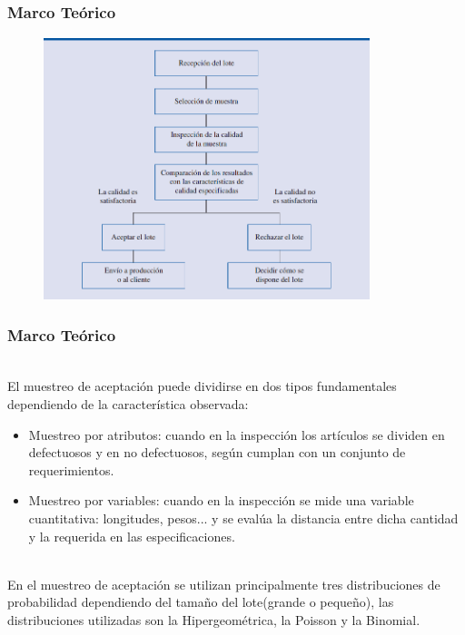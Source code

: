 \documentclass[11pt]{beamer}
\begin{document}
\begin{frame}
\frametitle{Marco Teórico}
\begin{figure}[!h]
        \includegraphics[width=9.5cm]{IMAGENES/MA.png}
        \label{figura1}
\end{figure}
\end{frame}

\begin{frame}
\frametitle{Marco Teórico}
~\\El muestreo de aceptación puede dividirse en dos tipos fundamentales dependiendo de la característica observada:
\begin{itemize}
\item Muestreo por atributos: cuando en la inspección los artículos se dividen en defectuosos y en no defectuosos, según cumplan con un conjunto de requerimientos.
\item Muestreo por variables: cuando en la inspección se mide una variable cuantitativa: longitudes, pesos... y se evalúa la distancia entre dicha cantidad y la requerida en las especificaciones.
\end{itemize}
~\\En el muestreo de aceptación se utilizan principalmente tres distribuciones de probabilidad dependiendo del tamaño del lote(grande o pequeño), las distribuciones utilizadas son la Hipergeométrica, la Poisson y la Binomial.
\end{frame}
\end{document}
